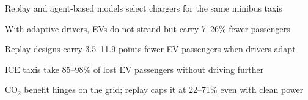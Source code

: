 \begin{highlights}
    \item Replay and agent-based models select chargers for the same minibus taxis
    \item With adaptive drivers, EVs do not strand but carry 7--26\% fewer passengers
    \item Replay designs carry 3.5--11.9 points fewer EV passengers when drivers adapt
    \item ICE taxis take 85--98\% of lost EV passengers without driving further
    \item CO$_2$ benefit hinges on the grid; replay caps it at 22--71\% even with clean power
\end{highlights}
